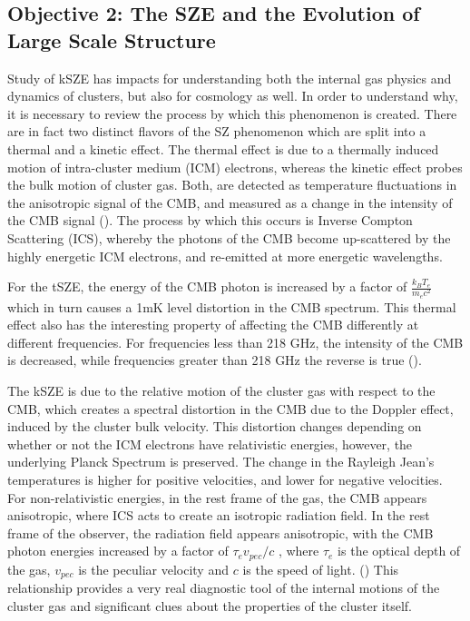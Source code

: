 \documentclass[manuscript]{aastex}
\begin{document}
\subsection{Objective 2: The SZE and the Evolution of Large Scale Structure}

Study of kSZE has impacts for understanding both the internal gas physics and dynamics of clusters, but also for cosmology as well. In order to understand why, it is necessary to review the process by which this phenomenon is created. There are in fact two distinct flavors of the SZ phenomenon which are split into a thermal and a kinetic effect. The thermal effect is due to a thermally induced motion of intra-cluster medium (ICM) electrons, whereas the kinetic effect probes the bulk motion of cluster gas. Both, are detected as temperature fluctuations in the anisotropic signal of the CMB, and measured as a change in the intensity of the CMB signal (\cite{Sunyaev1970}).  The process by which this occurs is Inverse Compton Scattering (ICS), whereby the photons of the CMB become up-scattered by the highly energetic ICM electrons, and re-emitted at more energetic wavelengths. 

For the tSZE, the energy of the CMB photon is increased by a factor of \(\frac{k_{B}T_{e}}{m_{e}c^{2}}\) which in turn causes a 1mK level distortion in the CMB spectrum. This thermal effect also has the interesting property of affecting the CMB differently at different frequencies. For frequencies less than 218 GHz, the intensity of the CMB is decreased, while frequencies greater than 218 GHz the reverse is true (\cite{Carlstrom2002}). 

The kSZE is due to the relative motion of the cluster gas with respect to the CMB, which creates a spectral distortion in the CMB due to the Doppler effect, induced by the cluster bulk velocity.  This distortion changes depending on whether or not the ICM electrons have relativistic energies, however, the underlying Planck Spectrum is preserved. The change in the Rayleigh Jean's temperatures is higher for positive velocities, and lower for negative velocities. For non-relativistic energies, in the rest frame of the gas, the CMB appears anisotropic, where ICS acts to create an isotropic radiation field. In the rest frame of the observer, the radiation field appears anisotropic, with the CMB photon energies increased by a factor of \(\tau_{e} v_{pec} / c\) , where \(\tau_{e}\) is the optical depth of the gas, \(v_{pec}\) is the peculiar velocity and \(c\) is the speed of light. (\cite{Birkinshaw1999}) This relationship provides a very real diagnostic tool of the internal motions of the cluster gas and significant clues about the properties of the cluster itself.
\end{document}
